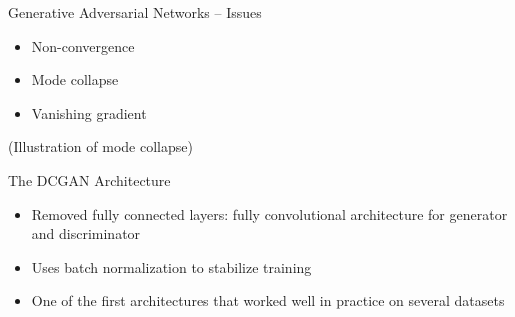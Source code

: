 \begin{frame}{Generative Adversarial Networks -- Issues}
\protect\hypertarget{generative-adversarial-networks-issues}{}

\begin{itemize}
\tightlist
\item
  Non-convergence
\item
  Mode collapse
\item
  Vanishing gradient
\end{itemize}


(Illustration of mode collapse)

\end{frame}

\begin{frame}{The DCGAN Architecture}
\protect\hypertarget{the-dcgan-architecture}{}

\begin{itemize}
\tightlist
\item
  Removed fully connected layers: fully convolutional architecture for
  generator and discriminator
\item
  Uses batch normalization to stabilize training
\item
  One of the first architectures that worked well in practice on several
  datasets
\end{itemize}

\end{frame}

